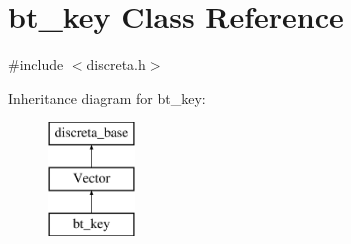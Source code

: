 \hypertarget{classbt__key}{}\section{bt\+\_\+key Class Reference}
\label{classbt__key}


{\ttfamily \#include $<$discreta.\+h$>$}

Inheritance diagram for bt\+\_\+key\+:\begin{figure}[H]
\begin{center}
\leavevmode
\includegraphics[height=3.000000cm]{classbt__key}
\end{center}
\end{figure}

